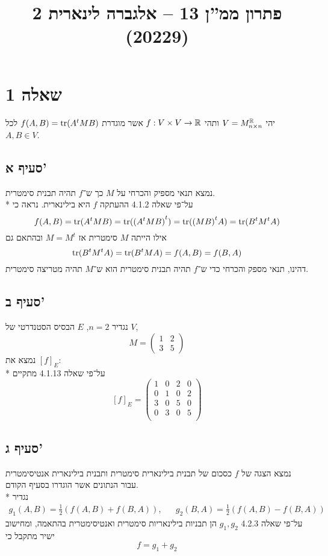 
\title{פתרון ממ''ן 13 – אלגברה לינארית 2 (20229)}


\maketitle

\section{שאלה 1}
יהי $V = M_{n \times n}^{\mathbb{R}}$ ותהי $f: V \times V \to \mathbb{R}$ אשר מוגדרת $f(A, B) = \operatorname{tr}(A^t M B)$ לכל $A, B \in V$.

\subsection{סעיף א'}
נמצא תנאי מספיק והכרחי על $M$ כך ש־$f$ תהיה תבנית סימטרית. \\*
על־פי שאלה 4.1.2 ההעתקה $f$ היא בילינארית. נראה כי
\[
	f(A, B) = \operatorname{tr}(A^t M B) = \operatorname{tr}( {(A^t M B)}^t ) = \operatorname{tr}( {(M B)}^t A) = \operatorname{tr}( B^t M^t A)
\]
אילו הייתה $M$ סימטרית אז $M = M^t$ ובהתאם גם
\[
	\operatorname{tr}(B^t M^t A) = \operatorname{tr}( B^t M A) = f(A, B) = f(B, A)
\]
דהינו, תנאי מספק והכרחי כדי ש־$f$ תהיה תבנית סימטרית הוא ש־$M$ תהיה מטריצה סימטרית.

\subsection{סעיף ב'}
נגדיר $n = 2$, $E$ הבסיס הסטנדרטי של $V$,
\[
	M = \begin{pmatrix}
		1 & 2 \\
		3 & 5
	\end{pmatrix}
\]
נמצא את ${[f]}_E$: \\*
על־פי שאלה 4.1.13 מתקיים
\[
	{[f]}_E = \begin{pmatrix}
		1 & 0 & 2 & 0 \\
		0 & 1 & 0 & 2 \\
		3 & 0 & 5 & 0 \\
		0 & 3 & 0 & 5 \\
	\end{pmatrix}
\]

\subsection{סעיף ג'}
נמצא הצגה של $f$ כסכום של תבנית בילינארית סימטרית ותבנית בילינארית אנטיסימטרית עבור הנתונים אשר הוגדרו בסעיף הקודם. \\*
נגדיר
\begin{align*}
	g_1(A, B) = \frac{1}{2} (f(A, B) + f(B, A)), && g_2(B, A) = \frac{1}{2}(f(A, B) - f(B, A))
\end{align*}
על־פי שאלה 4.2.3 $g_1, g_2$ הן תבניות בילינאריות סימטרית ואנטיסימטרית בהתאמה, ומחישוב ישיר מתקבל כי
\[
	f = g_1 + g_2
\]

